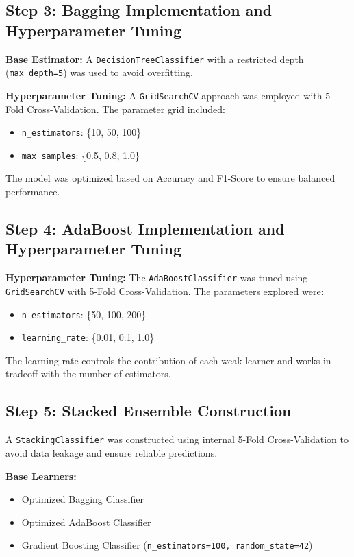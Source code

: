 \documentclass[11pt]{article}
\begin{document}
\subsection{Step 3: Bagging Implementation and Hyperparameter Tuning}

\textbf{Base Estimator:} A \texttt{DecisionTreeClassifier} with a restricted depth (\texttt{max\_depth=5}) was used to avoid overfitting.

\textbf{Hyperparameter Tuning:} A \texttt{GridSearchCV} approach was employed with 5-Fold Cross-Validation. The parameter grid included:
\begin{itemize}
    \item \texttt{n\_estimators}: \{10, 50, 100\}
    \item \texttt{max\_samples}: \{0.5, 0.8, 1.0\}
\end{itemize}

The model was optimized based on Accuracy and F1-Score to ensure balanced performance.

\subsection{Step 4: AdaBoost Implementation and Hyperparameter Tuning}

\textbf{Hyperparameter Tuning:} The \texttt{AdaBoostClassifier} was tuned using \texttt{GridSearchCV} with 5-Fold Cross-Validation. The parameters explored were:
\begin{itemize}
    \item \texttt{n\_estimators}: \{50, 100, 200\}
    \item \texttt{learning\_rate}: \{0.01, 0.1, 1.0\}
\end{itemize}

The learning rate controls the contribution of each weak learner and works in tradeoff with the number of estimators.

\subsection{Step 5: Stacked Ensemble Construction}

A \texttt{StackingClassifier} was constructed using internal 5-Fold Cross-Validation to avoid data leakage and ensure reliable predictions.

\textbf{Base Learners:}
\begin{itemize}
    \item Optimized Bagging Classifier
    \item Optimized AdaBoost Classifier
    \item Gradient Boosting Classifier (\texttt{n\_estimators=100, random\_state=42})
\end{itemize}
\end{document}
